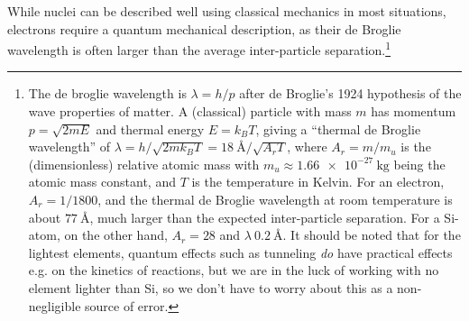 \documentclass[11pt,bibliography=totoc,index=totoc]{scrbook}   %
\begin{document}

While nuclei can be described well using classical mechanics in most situations, electrons require a quantum mechanical description, as their de Broglie wavelength
is often larger than the average inter-particle separation.\footnote{The de broglie wavelength is $\lambda=h/p$ after de Broglie's 1924 hypothesis of the wave properties of matter.\cite{deBroglie:1924} A (classical) particle with mass $m$ has momentum $p=\sqrt{2mE}$ and thermal energy $E=k_BT$, giving a ``thermal de Broglie wavelength''\cite[114]{Styer:2007} of $\lambda=h/\sqrt{2mk_BT}=\SI{18}{\angstrom}/\sqrt{A_r T}$, where $A_r=m/m_u$ is the (dimensionless) relative atomic mass with
$m_u\approx\SI{1.66e-27}{\kilogram}$ being the atomic mass constant, and $T$ is the temperature in Kelvin. For an electron, $A_r=1/1800$, and the thermal de Broglie wavelength at room temperature is about $\SI{77}{\angstrom}$, much larger than the expected inter-particle separation. For a Si-atom, on the other hand, $A_r=28$ and $\lambda ~ \SI{0.2}{\angstrom}$. It should be noted that for the lightest elements, quantum effects such as tunneling \emph{do} have practical effects e.g. on the kinetics of reactions, but we are in the luck of working with no element lighter than Si, so we don't have to worry about this as a non-negligible source of error.}


\end{document}
